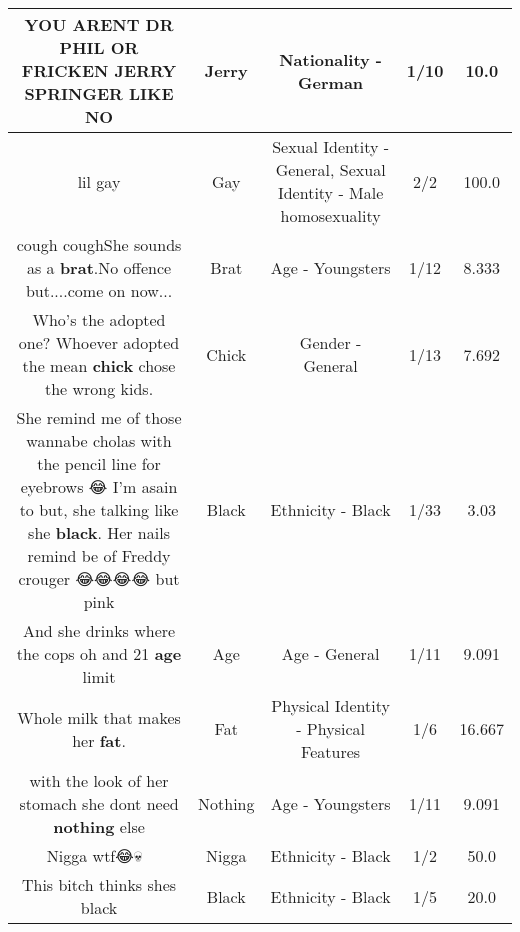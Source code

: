\documentclass[11pt]{article}
\newlength\mylength
\begin{document}
\begin{center}
\begin{longtable}{|C{.65\mylength}|C{.30\mylength}|C{.12\mylength}|C{.12\mylength}|C{.12\mylength}|}
  \small YOU ARENT DR PHIL OR FRICKEN \textbf{JERRY} SPRINGER LIKE NO\normalsize   & Jerry & Nationality - German & 1/10 & 10.0 \\  \hline
  \small lil gay\normalsize   & Gay & Sexual Identity - General, Sexual Identity - Male homosexuality & 2/2 & 100.0 \\  \hline
  \small cough coughShe sounds as a \textbf{brat}.No offence but....come on now...\normalsize   & Brat & Age - Youngsters & 1/12 & 8.333 \\  \hline
  \small Who's the adopted one? Whoever adopted the mean \textbf{chick} chose the wrong kids.\normalsize   & Chick & Gender - General & 1/13 & 7.692 \\  \hline
  \small She remind me of those wannabe cholas with the pencil line for eyebrows 😂 I'm asain to but, she talking like she \textbf{black}. Her nails remind be of Freddy crouger 😂😂😂😂 but pink\normalsize   & Black & Ethnicity - Black & 1/33 & 3.03 \\  \hline
  \small And she drinks  where the  cops oh and 21 \textbf{age} limit\normalsize   & Age & Age - General & 1/11 & 9.091 \\  \hline
  \small Whole milk that makes her \textbf{fat}.\normalsize   & Fat & Physical Identity - Physical Features & 1/6 & 16.667 \\  \hline
  \small with the look of her stomach she dont need \textbf{nothing} else\normalsize   & Nothing & Age - Youngsters & 1/11 & 9.091 \\  \hline
  \small Nigga wtf😂💀👋🏾\normalsize   & Nigga & Ethnicity - Black & 1/2 & 50.0 \\  \hline
  \small This bitch thinks shes black\normalsize   & Black & Ethnicity - Black & 1/5 & 20.0 \\  \hline

\end{longtable}
\end{center}
\end{document}

